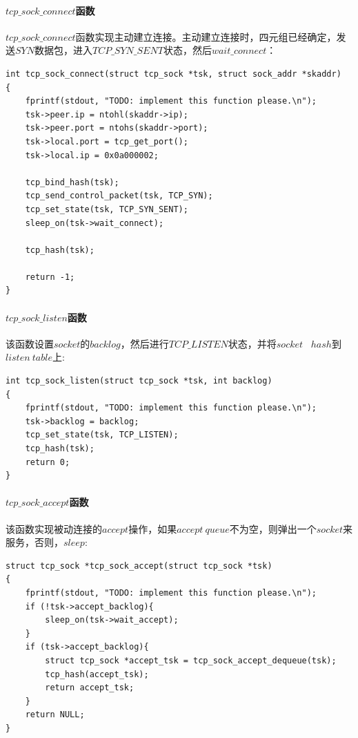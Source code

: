 \documentclass[UTF8,noindent]{ctexart}
\begin{document}
\paragraph{$tcp\_sock\_connect$函数}
$tcp\_sock\_connect$函数实现主动建立连接。主动建立连接时，四元组已经确定，发送$SYN$数据包，进入$TCP\_SYN\_SENT$状态，然后$wait\_connect$：
\begin{lstlisting}
int tcp_sock_connect(struct tcp_sock *tsk, struct sock_addr *skaddr)
{
	fprintf(stdout, "TODO: implement this function please.\n");
	tsk->peer.ip = ntohl(skaddr->ip);
	tsk->peer.port = ntohs(skaddr->port);
	tsk->local.port = tcp_get_port();
	tsk->local.ip = 0x0a000002;

	tcp_bind_hash(tsk);
	tcp_send_control_packet(tsk, TCP_SYN);
	tcp_set_state(tsk, TCP_SYN_SENT);
	sleep_on(tsk->wait_connect);

	tcp_hash(tsk);

	return -1;
}
\end{lstlisting}

\paragraph{$tcp\_sock\_listen$函数}
该函数设置$socket$的$backlog$，然后进行$TCP\_LISTEN$状态，并将$socket$ \ $hash$到$listen\ table$上:
\begin{lstlisting}
int tcp_sock_listen(struct tcp_sock *tsk, int backlog)
{
	fprintf(stdout, "TODO: implement this function please.\n");
	tsk->backlog = backlog;
	tcp_set_state(tsk, TCP_LISTEN);
	tcp_hash(tsk);
	return 0;
}
\end{lstlisting}

\paragraph{$tcp\_sock\_accept$函数}
该函数实现被动连接的$accept$操作，如果$accept\ queue$不为空，则弹出一个$socket$来服务，否则，$sleep$:
\begin{lstlisting}
struct tcp_sock *tcp_sock_accept(struct tcp_sock *tsk)
{
	fprintf(stdout, "TODO: implement this function please.\n");
	if (!tsk->accept_backlog){
		sleep_on(tsk->wait_accept);
	}
	if (tsk->accept_backlog){
		struct tcp_sock *accept_tsk = tcp_sock_accept_dequeue(tsk);
		tcp_hash(accept_tsk);
		return accept_tsk;
	}
	return NULL;
}
\end{lstlisting}
\end{document}
